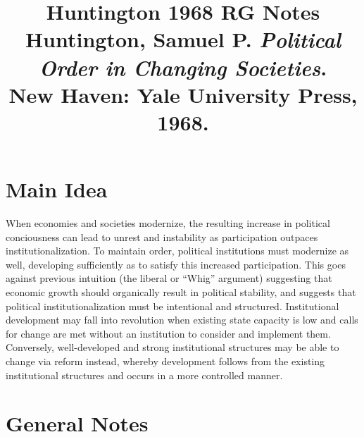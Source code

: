 \documentclass[12pt]{article}
\title{\textbf{Huntington 1968 RG Notes}\\
\large Huntington, Samuel P. \textit{Political Order in Changing Societies}.\\
New Haven: Yale University Press, 1968.}
\author{}
\date{}
\begin{document}
\maketitle

\section{Main Idea}

When economies and societies modernize, the resulting increase in political conciousness can lead to unrest and instability as participation outpaces institutionalization. To maintain order, political institutions must modernize as well, developing sufficiently as to satisfy this increased participation. This goes against previous intuition (the liberal or ``Whig'' argument) suggesting that economic growth should organically result in political stability, and suggests that political institutionalization must be intentional and structured. Institutional development may fall into revolution when existing state capacity is low and calls for change are met without an institution to consider and implement them. Conversely, well-developed and strong institutional structures may be able to change via reform instead, whereby development follows from the existing institutional structures and occurs in a more controlled manner.


\section{General Notes}
\end{document}
